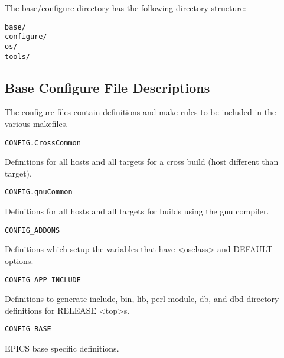 The base/configure directory has the following directory structure:

\begin{verbatim}base/
configure/
os/
tools/

\end{verbatim}\subsection{Base Configure File Descriptions}

The configure files contain definitions and make rules to be included in the various makefiles.

\begin{verbatim}CONFIG.CrossCommon
\end{verbatim}\begin{description}\item Definitions for all hosts and all targets for a cross build (host different than target).

\end{description}\begin{verbatim}CONFIG.gnuCommon
\end{verbatim}\begin{description}\item Definitions for all hosts and all targets for builds using the gnu compiler.

\end{description}\begin{verbatim}CONFIG_ADDONS
\end{verbatim}\begin{description}\item Definitions which setup the variables that have \textless{}osclass\textgreater{} and DEFAULT options.

\end{description}\begin{verbatim}CONFIG_APP_INCLUDE
\end{verbatim}\begin{description}\item Definitions to generate include, bin, lib, perl module, db, and dbd directory definitions for RELEASE \textless{}top\textgreater{}s.

\end{description}\begin{verbatim}CONFIG_BASE
\end{verbatim}\begin{description}\item EPICS base specific definitions.


\end{description}
